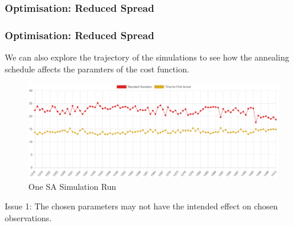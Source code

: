 \documentclass{beamer}
\begin{document}
\begin{frame}
    \frametitle{Optimisation: Reduced Spread}

\end{frame}

\begin{frame}
    \frametitle{Optimisation: Reduced Spread}
    We can also explore the trajectory of the simulations to see how the annealing schedule affects the paramters of the cost function.
    \begin{figure}
        \includegraphics[width=0.7\linewidth]{chart}
        \caption{One SA Simulation Run}
    \end{figure}
    

    Issue 1: The chosen parameters may not have the intended effect on chosen observations.

\end{frame}
\end{document}
